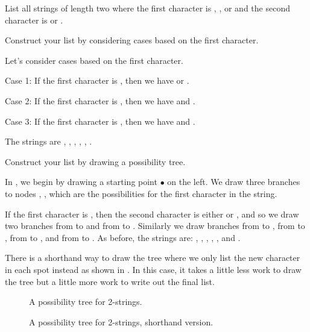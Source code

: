 \begin{exam} [2-strings] 
\label{exam_2strings}
    List all strings of length two where the first character is , , or  and the second character is  or .
    \begin{apart} 
    \item Construct your list by considering cases based on the first character.
        \begin{soln}
            Let's consider cases based on the first character.  
        
            Case 1:  If the first character is , then we have  or .
        
            Case 2:  If the first character is , then we have  and .
        
            Case 3:  If the first character is , then we have  and .
        
            The strings are , , , , , .  
        \end{soln} 
    \item Construct your list by drawing a possibility tree.
        \begin{soln}
            In , we begin by drawing a starting point $\bullet$ on the left.  We draw three branches to nodes , ,  which are the possibilities for the first character in the string. 

            If the first character is , then the second character is either  or , and so we draw two branches from  to  and from  to . Similarly we draw branches from  to , from  to , from  to , and from  to . As before, the strings are: , , , , , and .    
    
        There is a shorthand way to draw the tree where we only list the new character in each spot instead as shown in .  In this case, it takes a little less work to draw the tree but a little more work to write out the final list.
         \end{soln}

         \begin{figure}[ht]
            \centering           
            \caption{A possibility tree for 2-strings.}
            \label{fig_tree_2strings}
        \end{figure}
         
         \begin{figure}[ht]
            \centering            
            \caption{A possibility tree for 2-strings, shorthand version.}
            \label{fig_tree_2strings_shorthand}
            \end{figure}
    \end{apart}
\end{exam}

